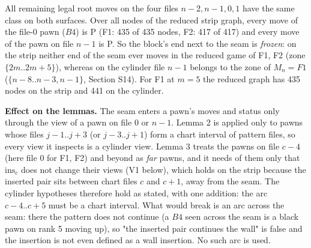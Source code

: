 \par{}\par\smallskip
All remaining legal root moves on the four files $n-2,n-1,0,1$ have the same class on both surfaces. Over all nodes of the reduced strip graph, every move of the file-0 pawn ($B4$) is P (F1: 435 of 435 nodes, F2: 417 of 417) and every move of the pawn on file $n-1$ is P. So the block's end next to the seam is \emph{frozen}: on the strip neither end of the seam ever moves in the reduced game of F1, F2 (zone $\{2m..2m+5\}$), whereas on the cylinder file $n-1$ belongs to the zone of $M_n=F1$ ($\{n-8..n-3,n-1\}$, Section S14). For F1 at $m=5$ the reduced graph has 435 nodes on the strip and 441 on the cylinder.

\textbf{Effect on the lemmas.} The seam enters a pawn's moves and status only through the view of a pawn on file $0$ or $n-1$. Lemma 2 is applied only to pawns whose files $j-1..j+3$ (or $j-3..j+1$) form a chart interval of pattern files, so every view it inspects is a cylinder view. Lemma 3 treats the pawns on file $c-4$ (here file $0$ for F1, F2) and beyond as \emph{far} pawns, and it needs of them only that $\mathrm{ins}_c$ does not change their views (V1 below), which holds on the strip because the inserted pair sits between chart files $c$ and $c+1$, away from the seam. The cylinder hypotheses therefore hold as stated, with one addition: the arc $c-4..c+5$ must be a chart interval. What would break is an arc across the seam: there the pattern does not continue (a $B4$ seen across the seam is a black pawn on rank 5 moving up), so "the inserted pair continues the wall" is false and the insertion is not even defined as a wall insertion. No such arc is used.

